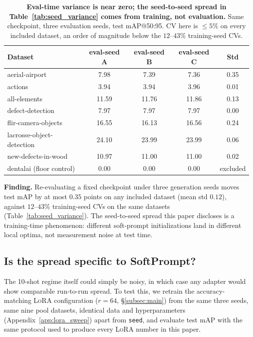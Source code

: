 \documentclass{article}
\newcommand{\lora}{\textsc{LoRA}}
\newenvironment{finding}
  {\par\smallskip\noindent\begin{lrbox}{\findingbox}%
   \begin{minipage}{\dimexpr\linewidth-2\fboxsep-2\fboxrule\relax}\small}
  {\end{minipage}\end{lrbox}%
   \setlength{\fboxrule}{0.9pt}%
   \noindent\fcolorbox{findingframe}{findingback}{\usebox{\findingbox}}\par\smallskip}
\begin{document}
\begin{table}[h]
  \centering
  \caption{\textbf{Eval-time variance is near zero; the seed-to-seed spread in Table~\ref{tab:seed_variance} comes from training, not evaluation.} Same checkpoint, three evaluation seeds, test mAP@50:95. CV here is $\leq\!5\%$ on every included dataset, an order of magnitude below the $12$--$43\%$ training-seed CVs.}
  \label{tab:eval_seed_variance}
  \small
  \setlength{\tabcolsep}{7pt}
  \begin{tabular}{lcccc}
    \toprule
    Dataset & eval-seed A & eval-seed B & eval-seed C & Std \\
    \midrule
    aerial-airport             & 7.98  & 7.39  & 7.36  & 0.35 \\
    actions                    & 3.94  & 3.94  & 3.96  & 0.01 \\
    all-elements                & 11.59 & 11.76 & 11.86 & 0.13 \\
    defect-detection            & 7.97  & 7.97  & 7.97  & 0.00 \\
    flir-camera-objects         & 16.55 & 16.13 & 16.56 & 0.24 \\
    lacrosse-object-detection   & 24.10 & 23.99 & 23.99 & 0.06 \\
    new-defects-in-wood         & 10.97 & 11.00 & 11.00 & 0.02 \\
    \midrule
    dentalai (floor control)    & 0.00  & 0.00  & 0.00  & \multicolumn{1}{c}{excluded} \\
    \bottomrule
  \end{tabular}
\end{table}
\begin{finding} \textbf{Finding.} Re-evaluating a fixed checkpoint under three generation seeds moves test mAP by at most $0.35$ points on any included dataset (mean std $0.12$), against $12$--$43\%$ training-seed CVs on the same datasets (Table~\ref{tab:seed_variance}). The seed-to-seed spread this paper discloses is a training-time phenomenon: different soft-prompt initializations land in different local optima, not measurement noise at test time.
\end{finding}

\subsection{Is the spread specific to SoftPrompt?}
\label{app:lora_seed_variance}

The 10-shot regime itself could simply be noisy, in which case any adapter would show comparable run-to-run spread. To test this, we retrain the accuracy-matching \lora{} configuration ($r{=}64$, \S\ref{subsec:main}) from the same three seeds, same nine pool datasets, identical data and hyperparameters (Appendix~\ref{app:lora_sweep}) apart from \texttt{seed}, and evaluate test mAP with the same protocol used to produce every \lora{} number in this paper.
\end{document}
